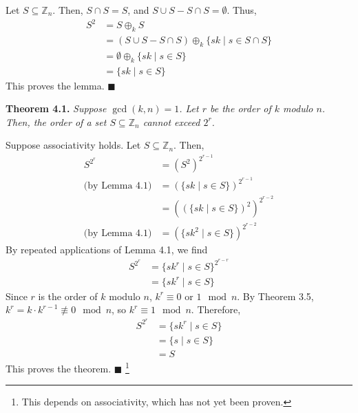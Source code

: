 \documentclass{article}
\newcommand{\zee}{\mathbb{Z}}
\begin{document}
Let $S \subseteq \zee_n$.
Then, $S \cap S = S$, and $S \cup S - S \cap S = \emptyset$.
Thus,
\[\begin{split}
S^2 &= S \oplus_k S \\
&= (S \cup S - S \cap S) \oplus_k \{sk \mid s \in S \cap S\} \\
&= \emptyset \oplus_k \{sk \mid s \in S\} \\
&= \{sk \mid s \in S\}
\end{split}\]
This proves the lemma. $\blacksquare$

\textbf{Theorem 4.1.} \textit{Suppose $\gcd(k, n) = 1$.
Let $r$ be the order of $k$ modulo $n$.
Then, the order of a set $S \subseteq \zee_n$ cannot exceed $2^r$.}

Suppose associativity holds. Let $S \subseteq \zee_n$.
Then,
\[\begin{split}
    S^{2^r} &= (S^2)^{2^{r-1}} \\
    \text{(by Lemma 4.1)} &= (\{sk \mid s \in S\})^{2^{r-1}} \\
    &= ((\{sk \mid s \in S\})^2)^{2^{r-2}} \\
    \text{(by Lemma 4.1)} &= (\{sk^2 \mid s \in S\})^{2^{r-2}}
\end{split}\]
By repeated applications of Lemma 4.1, we find
\[\begin{split}
    S^{2^r} &= \{sk^r \mid s \in S\}^{2^{r-r}} \\
    &= \{sk^r \mid s \in S\}
\end{split}\]
Since $r$ is the order of $k$ modulo $n$, $k^r \equiv 0$ or $1 \mod n$.
By Theorem 3.5, $k^r = k \cdot k^{r-1} \not\equiv 0 \mod n$, so
$k^r \equiv 1 \mod n$. Therefore,
\[\begin{split}
    S^{2^r} &= \{sk^r \mid s \in S\} \\
    &= \{s \mid s \in S\} \\
    &= S
\end{split}\]
This proves the theorem. $\blacksquare$
\footnote{This depends on associativity, which has not yet been proven.}
\end{document}
